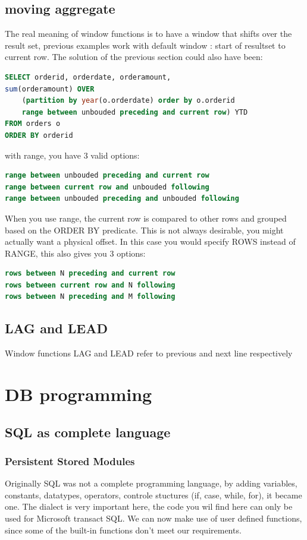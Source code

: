 \documentclass{report}
\begin{document}
	\section{moving aggregate}
	The real meaning of window functions is to have a window that shifts over the result set, previous examples work with default window : start of resultset to current row. The solution of the previous section could also have been: 
	\begin{lstlisting}[language=sql]
SELECT orderid, orderdate, orderamount,
sum(orderamount) OVER 
	(partition by year(o.orderdate) order by o.orderid
	range between unbouded preceding and current row) YTD
FROM orders o
ORDER BY orderid	\end{lstlisting}
	with range, you have 3 valid options: 
	\begin{lstlisting}[language = sql]
range between unbouded preceding and current row
range between current row and unbouded following
range between unbouded preceding and unbouded following	\end{lstlisting}
	When you use range, the current row is compared to other rows and grouped based on the ORDER BY predicate. This is not always desirable, you might actually want a physical offset. In this case you would specify ROWS instead of RANGE, this also gives you 3 options: 
	\begin{lstlisting}[language = sql]
rows between N preceding and current row
rows between current row and N following
rows between N preceding and M following	\end{lstlisting}

	\section{LAG and LEAD}
	Window functions LAG and LEAD refer to previous and next line respectively
	\chapter{DB programming}
	\section{SQL as complete language}
	\subsection{Persistent Stored Modules}
	Originally SQL was not a complete programming language, by adding variables, constants, datatypes, operators, controle stuctures (if, case, while, for), it became one. The dialect is very important here, the code you wil find here can only be used for Microsoft transact SQL. We can now make use of user defined functions, since some of the built-in functions don't meet our requirements.
\end{document}
